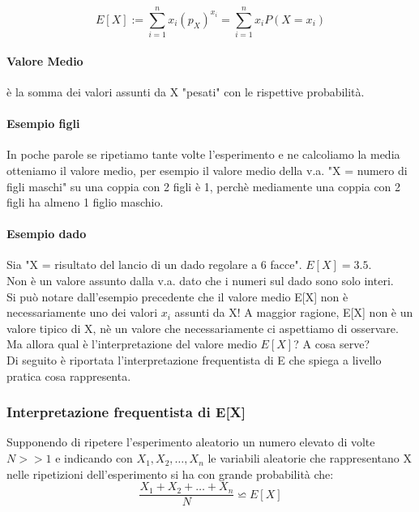 \begin{equation}
    E[X]:= \sum_{i = 1}^{n} x_i (p_X)^{x_i} = \sum_{i = 1}^{n} x_i P(X= x_i)
\end{equation}
\paragraph{Valore Medio} è la somma dei valori assunti da X "pesati" con le rispettive probabilità.

\paragraph*{Esempio figli}In poche parole se ripetiamo tante volte l'esperimento e ne calcoliamo la media otteniamo
il valore medio, per esempio il valore medio della v.a. "X = numero di figli maschi"
su una coppia con 2 figli è 1, perchè mediamente una coppia con 2 figli ha almeno 1 figlio maschio.

\paragraph*{Esempio dado} Sia "X = risultato del lancio di un dado regolare a 6 facce".
$E[X] = 3.5$. 
\\ Non è un valore assunto dalla v.a. dato che i numeri sul dado sono solo interi.
\\ Si può notare dall'esempio precedente che il valore medio E[X] non è necessariamente
uno dei valori $x_i$ assunti da X!
A maggior ragione, E[X] non è un valore tipico di X, nè un valore che necessariamente
ci aspettiamo di osservare.
\\ Ma allora qual è l'interpretazione del valore medio $E[X]$? A cosa serve?
\\ Di seguito è riportata l'interpretazione frequentista di E che spiega a livello
pratica cosa rappresenta.

\subsubsection{Interpretazione frequentista di E[X]}
Supponendo di ripetere l'esperimento aleatorio un numero elevato di volte $N >> 1$
e indicando con $X_1, X_2, \dots, X_n$ le variabili aleatorie che rappresentano X nelle
ripetizioni dell'esperimento si ha con grande probabilità che:
\begin{equation}
    \frac{X_1 + X_2 + \dots + X_n}{N} \backsimeq  E[X]
\end{equation}


